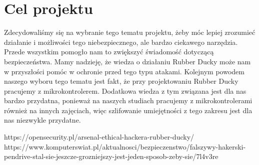 \documentclass{article}
\begin{document}
\section{Cel projektu}
Zdecydowaliśmy się na wybranie tego tematu projektu, żeby móc lepiej zrozumieć działanie i możliwości tego niebezpiecznego, ale bardzo ciekawego narzędzia. Przede wszystkim pomogło nam to zwiększyć świadomość dotyczącą bezpieczeństwa. Mamy nadzieję, że wiedza o działaniu Rubber Ducky może nam w przyszłości pomóc w ochronie przed tego typu atakami. Kolejnym powodem naszego wyboru tego tematu jest fakt, że przy projektowaniu Rubber Ducky pracujemy z mikrokontrolerem. Dodatkowa wiedza z tym związana jest dla nas bardzo przydatna, ponieważ na naszych studiach pracujemy z mikrokontrolerami również na innych zajęciach, więc szlifowanie umiejętności z tego zakresu jest dla nas niezwykle przydatne.




\begin{thebibliography}{9}

  https://opensecurity.pl/arsenal-ethical-hackera-rubber-ducky/
  https://www.komputerswiat.pl/aktualnosci/bezpieczenstwo/falszywy-hakerski-pendrive-stal-sie-jeszcze-grozniejszy-jest-jeden-sposob-zeby-sie/7l4v3re
  
  
\end{thebibliography}
\end{document}
